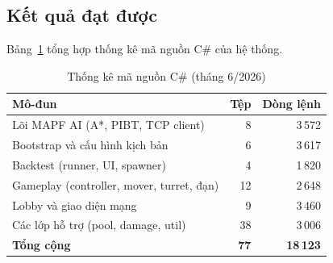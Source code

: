 \documentclass[../DoAn.tex]{subfiles}
\begin{document}
\begin{table}[htbp]
\centering
\caption{Công cụ và thư viện sử dụng}
\label{tab:tools}
\end{table}

\subsection{Kết quả đạt được}

Bảng~\ref{tab:codestats} tổng hợp thống kê mã nguồn C\# của hệ thống.

\begin{table}[htbp]
\centering
\caption{Thống kê mã nguồn C\# (tháng 6/2026)}
\label{tab:codestats}
\begin{tabular}{|l|r|r|}
\hline
\textbf{Mô-đun}                             & \textbf{Tệp} & \textbf{Dòng lệnh} \\ \hline
Lõi MAPF AI (A*, PIBT, TCP client)          &  8           & 3\,572             \\
Bootstrap và cấu hình kịch bản              &  6           & 3\,617             \\
Backtest (runner, UI, spawner)              &  4           & 1\,820             \\
Gameplay (controller, mover, turret, đạn)  & 12           & 2\,648             \\
Lobby và giao diện mạng                    &  9           & 3\,460             \\
Các lớp hỗ trợ (pool, damage, util)        & 38           & 3\,006             \\ \hline
\textbf{Tổng cộng}                          & \textbf{77}  & \textbf{18\,123}   \\ \hline
\end{tabular}
\end{table}
\end{document}
